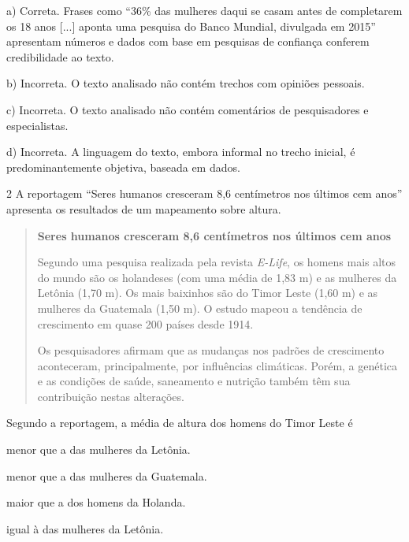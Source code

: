 
a) Correta. Frases como ``36\% das mulheres daqui se casam
antes de completarem os 18 anos {[}...{]} aponta uma pesquisa do Banco
Mundial, divulgada em 2015'' apresentam números e dados com base em
pesquisas de confiança conferem credibilidade ao texto.

b) Incorreta. O texto analisado não contém trechos com opiniões pessoais.

c) Incorreta. O texto analisado não contém comentários de pesquisadores e especialistas.

d)  Incorreta. A linguagem do texto, embora informal no trecho inicial,
é predominantemente objetiva, baseada em dados.

\num{2} A reportagem ``Seres humanos cresceram 8,6 centímetros nos últimos cem
anos'' apresenta os resultados de um mapeamento sobre altura.

\begin{quote}
\textbf{Seres humanos cresceram 8,6 centímetros nos últimos cem anos}

Segundo uma pesquisa realizada pela revista \textit{E-Life}, os homens
mais altos do mundo são os holandeses (com uma média de 1,83 m) e as
mulheres da Letônia (1,70 m). Os mais baixinhos são do Timor Leste (1,60 m)
e as mulheres da Guatemala (1,50 m). O estudo mapeou a tendência de
crescimento em quase 200 países desde 1914.

Os pesquisadores afirmam que as mudanças nos padrões de crescimento
aconteceram, principalmente, por influências climáticas. Porém, a 
genética e as condições de saúde, saneamento e nutrição também têm sua
contribuição nestas alterações.

\end{quote}

Segundo a reportagem, a média de altura dos homens do Timor Leste é

\begin{escolha}
\item menor que a das mulheres da Letônia.

\item menor que a das mulheres da Guatemala.

\item maior que a dos homens da Holanda.

\item igual à das mulheres da Letônia.
\end{escolha}


